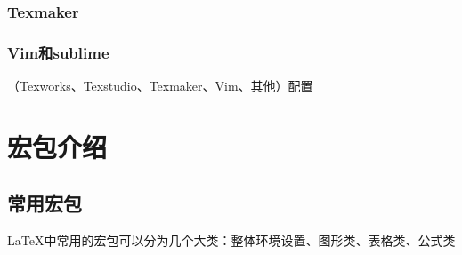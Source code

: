 \documentclass[12pt]{book}
\begin{document}
\subsection{Texmaker}

\subsection{Vim和sublime}
（Texworks、Texstudio、Texmaker、Vim、其他）配置

\chapter{宏包介绍}

\section{常用宏包}
\LaTeX{}中常用的宏包可以分为几个大类：整体环境设置、图形类、表格类、公式类
\end{document}

